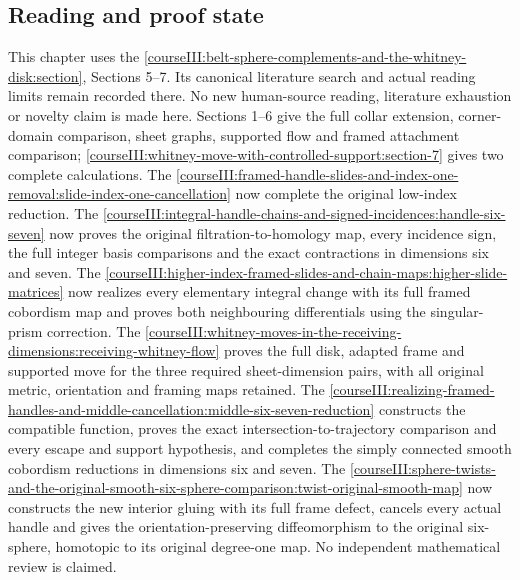 \subsection{Reading and proof state}
\label{courseIII:whitney-move-with-controlled-support:move-sources}

This chapter uses the \cref{courseIII:belt-sphere-complements-and-the-whitney-disk:section}, Sections 5--7. Its canonical literature search and actual reading limits remain recorded there. No new human-source reading, literature exhaustion or novelty claim is made here. Sections 1--6 give the full collar extension, corner-domain comparison, sheet graphs, supported flow and framed attachment comparison; \cref{courseIII:whitney-move-with-controlled-support:section-7} gives two complete calculations. The \cref{courseIII:framed-handle-slides-and-index-one-removal:slide-index-one-cancellation} now complete the original low-index reduction. The \cref{courseIII:integral-handle-chains-and-signed-incidences:handle-six-seven} now proves the original filtration-to-homology map, every incidence sign, the full integer basis comparisons and the exact contractions in dimensions six and seven. The \cref{courseIII:higher-index-framed-slides-and-chain-maps:higher-slide-matrices} now realizes every elementary integral change with its full framed cobordism map and proves both neighbouring differentials using the singular-prism correction. The \cref{courseIII:whitney-moves-in-the-receiving-dimensions:receiving-whitney-flow} proves the full disk, adapted frame and supported move for the three required sheet-dimension pairs, with all original metric, orientation and framing maps retained. The \cref{courseIII:realizing-framed-handles-and-middle-cancellation:middle-six-seven-reduction} constructs the compatible function, proves the exact intersection-to-trajectory comparison and every escape and support hypothesis, and completes the simply connected smooth cobordism reductions in dimensions six and seven. The \cref{courseIII:sphere-twists-and-the-original-smooth-six-sphere-comparison:twist-original-smooth-map} now constructs the new interior gluing with its full frame defect, cancels every actual handle and gives the orientation-preserving diffeomorphism to the original six-sphere, homotopic to its original degree-one map. No independent mathematical review is claimed.
